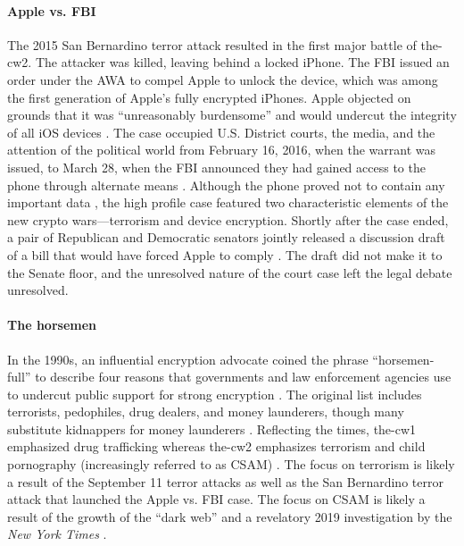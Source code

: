 \paragraph*{Apple vs. FBI} The 2015 San Bernardino terror attack resulted in the first major battle of \ac{the-cw2}. The
attacker was killed, leaving behind a locked iPhone. The \ac{FBI} issued an order under the \acrlong{AWA} to compel
Apple to unlock the device, which was among the first generation of Apple's fully encrypted iPhones. Apple objected on
grounds that it was ``unreasonably burdensome'' and would undercut the integrity of all iOS devices
\cite{schulze_clipper_2017}. The case occupied U.S. District courts, the media, and the attention of the political world
from February 16, 2016, when the warrant was issued, to March 28, when the \ac{FBI} announced they had gained access to
the phone through alternate means \cite{novet_2016}. Although the phone proved not to contain any important data
\cite{schulze_clipper_2017}, the high profile case featured two characteristic elements of the new crypto
wars---terrorism and device encryption. Shortly after the case ended, a pair of Republican and Democratic senators
jointly released a discussion draft of a bill that would have forced Apple to comply \cite{burr_2016}. The draft did not
make it to the Senate floor, and the unresolved nature of the court case left the legal debate unresolved.

\paragraph*{The \Ac{horsemen}} In the 1990s, an influential encryption advocate coined the phrase ``\ac{horsemen-full}''
to describe four reasons that governments and law enforcement agencies use to undercut public support for strong
encryption \cite{may_1994}. The original list includes terrorists, pedophiles, drug dealers, and money launderers,
though many substitute kidnappers for money launderers \cite{schneier_scaring_2019}. Reflecting the times, \ac{the-cw1}
emphasized drug trafficking whereas \ac{the-cw2} emphasizes terrorism and child pornography (increasingly referred to as
\ac{CSAM}) \cite{schulze_clipper_2017}. The focus on terrorism is likely a result of the September 11 terror attacks as
well as the San Bernardino terror attack that launched the Apple vs. \ac{FBI} case. The focus on \ac{CSAM} is likely a
result of the growth of the ``dark web'' and a revelatory 2019 investigation by the \textit{New York Times}
\cite{keller_internet_2019}.

